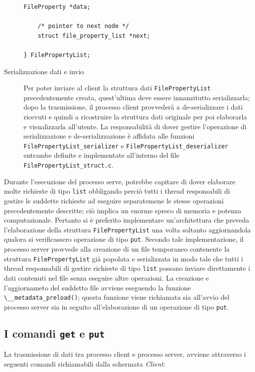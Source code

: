 \documentclass[10pt,a4paper, titlepage]{report}
\begin{document}
\begin{description}
\begin{lstlisting}[frame=lines, caption={Implementazione della struttura \texttt{FileProperty}}, label={code:FilePropertyList}]
	FileProperty *data;

	/* pointer to next node */
	struct file_property_list *next;

} FilePropertyList;
\end{lstlisting}

\item[Serializzazione dati e invio] Per poter inviare al client la struttura dati \texttt{FilePropertyList} precedentemente creata, quest'ultima deve essere innanzitutto serializzarla; dopo la trasmissione, il processo client provvederà a de-serializzare i dati ricevuti e quindi a ricostruire la struttura dati originale per poi elaborarla e visualizzarla all'utente. La responsabilità di dover gestire l'operazione di serializzazione e de-serializzazione è affidata alle funzioni \texttt{FilePropertyList\_serializer} e \texttt{FilePropertyList\_deserializer} entrambe definite e implementate all'interno del file \texttt{FilePropertyList\_struct.c}.
\end{description}

Durante l'esecuzione del processo serve, potrebbe capitare di dover elaborare molte richieste di tipo \texttt{list} obbligando perciò tutti i thread responsabili di gestire le suddette richieste ad eseguire separatemene le stesse operazioni precedentemente descritte; ciò implica un enorme spreco di memoria e potenza computazionale. Pertanto si è preferito implementare un'architettura che preveda l'elaborazione della struttura \texttt{FilePropertyList} una volta soltanto aggiornandola qualora si verificassero operazione di tipo \texttt{put}. Secondo tale implementazione, il processo server provvede alla creazione di un file temporaneo contenente la struttura \texttt{FilePropertyList} già popolata e serializzata in modo tale che tutti i thread responsabili di gestire richieste di tipo \texttt{list} possano inviare direttamente i dati contenuti nel file senza eseguire altre operazioni. La creazione e l'aggiornameto del suddetto file avviene eseguendo la funzione \verb!\__metadata_preload()!; questa funzione viene richiamata sia all'avvio del processo server sia in seguito all'elaborazione di un operazione di tipo \texttt{put}.

\subsection{I comandi \texttt{get} e \texttt{put}}\label{sec:get-put-command}

La trasmissione di dati tra processo client e processo server, avviene attraverso i seguenti comandi richiamabili dalla schermata \textit{Client}:
\end{document}
